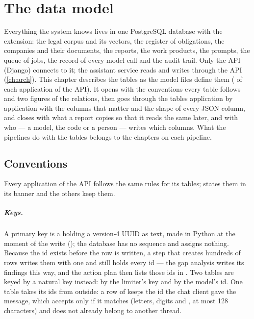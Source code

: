 \chapter{The data model}\label{ch:data}

Everything the system knows lives in one PostgreSQL database with the 
extension: the legal corpus and its vectors, the register of obligations, the companies and
their documents, the reports, the work products, the prompts, the queue of jobs, the record
of every model call and the audit trail. Only the API (Django) connects to it; the assistant
service reads and writes through the API (\cref{ch:arch}). This chapter describes the tables
as the model files define them ( of each application of the API). It
opens with the conventions every table follows and two figures of the relations, then goes
through the tables application by application with the columns that matter and the shape of
every JSON column, and closes with what a report copies so that it reads the same later, and
with who --- a model, the code or a person --- writes which columns. What the pipelines do with
the tables belongs to the chapters on each pipeline.

\section{Conventions}\label{sec:data:conventions}

Every application of the API follows the same rules for its tables; 
states them in its banner and the others keep them.

\paragraph{Keys.} A primary key is a  holding a version-4 UUID as text, made in
Python at the moment of the write (); the database has no sequence
and assigns nothing. Because the id exists before the row is written, a step that creates
hundreds of rows writes them with one  and still holds every id --- the
gap analysis writes its findings this way, and the action plan then lists those ids in
. Two tables are keyed by a natural key instead: 
by the limiter's key and  by the model's id. One table takes its ids from
outside: a row of  keeps the id the chat client gave the message, which
 accepts only if it matches  (letters, digits and
, at most 128 characters) and does not already belong to another thread.

